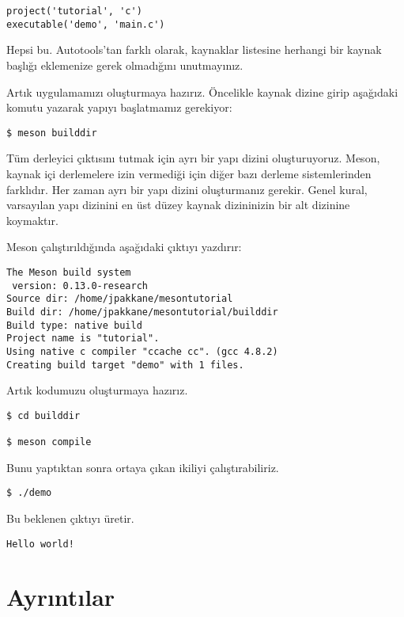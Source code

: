 \documentclass[
]{book}
\begin{document}
\begin{verbatim}
project('tutorial', 'c')
executable('demo', 'main.c')
\end{verbatim}

Hepsi bu. Autotools'tan farklı olarak, kaynaklar listesine herhangi bir kaynak başlığı eklemenize gerek olmadığını unutmayınız.

Artık uygulamamızı oluşturmaya hazırız. Öncelikle kaynak dizine girip aşağıdaki komutu yazarak yapıyı başlatmamız gerekiyor:

\begin{verbatim}
$ meson builddir
\end{verbatim}

Tüm derleyici çıktısını tutmak için ayrı bir yapı dizini oluşturuyoruz. Meson, kaynak içi derlemelere izin vermediği için diğer bazı derleme sistemlerinden farklıdır. Her zaman ayrı bir yapı dizini oluşturmanız gerekir. Genel kural, varsayılan yapı dizinini en üst düzey kaynak dizininizin bir alt dizinine koymaktır.

Meson çalıştırıldığında aşağıdaki çıktıyı yazdırır:

\begin{verbatim}
The Meson build system
 version: 0.13.0-research
Source dir: /home/jpakkane/mesontutorial
Build dir: /home/jpakkane/mesontutorial/builddir
Build type: native build
Project name is "tutorial".
Using native c compiler "ccache cc". (gcc 4.8.2)
Creating build target "demo" with 1 files.
\end{verbatim}

Artık kodumuzu oluşturmaya hazırız.

\begin{verbatim}
$ cd builddir

$ meson compile
\end{verbatim}

Bunu yaptıktan sonra ortaya çıkan ikiliyi çalıştırabiliriz.

\begin{verbatim}
$ ./demo
\end{verbatim}

Bu beklenen çıktıyı üretir.

\begin{verbatim}
Hello world!
\end{verbatim}

\hypertarget{ayrux131ntux131lar-4}{%
\section*{Ayrıntılar}\label{ayrux131ntux131lar-4}}
\end{document}

